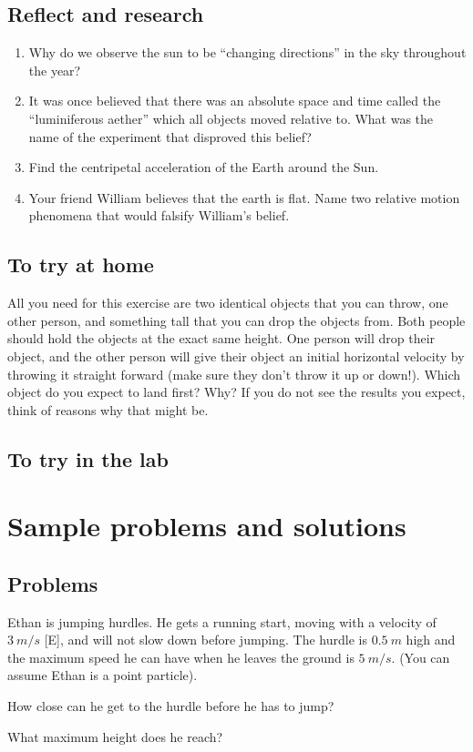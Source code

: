 \subsection{Reflect and research}

\begin{enumerate}
\item Why do we observe the sun to be ``changing directions'' in the sky throughout the year?
\item It was once believed that there was an absolute space and time called the ``luminiferous aether'' which all objects moved relative to. What was the name of the experiment that disproved this belief?
\item Find the centripetal acceleration of the Earth around the Sun.
\item Your friend William believes that the earth is flat. Name two relative motion phenomena that would falsify William's belief.
\end{enumerate}
\subsection{To try at home}

\begin{tQuestion}All you need for this exercise are two identical objects that you can throw, one other person, and something tall that you can drop the objects from. Both people should hold the objects at the exact same height. One person will drop their object, and the other person will give their object an initial horizontal velocity by throwing it straight forward (make sure they don't throw it up or down!). Which object do you expect to land first? Why? If you do not see the results you expect, think of reasons why that might be. \end{tQuestion}

\subsection{To try in the lab}

\section{Sample problems and solutions}
\subsection{Problems}
\begin{problemParts}{Ethan is jumping hurdles. He gets a running start, moving with a velocity of $\SI{3}{m/s}$ [E], and will not slow down before jumping. The hurdle is $\SI{0.5}{m}$ high and the maximum speed he can have when he leaves the ground is $\SI{5}{m/s}$. (You can assume Ethan is a point particle).\label{Q:hurdles}}
\item How close can he get to the hurdle before he has to jump?
\item What maximum height does he reach?
\end{problemParts}


